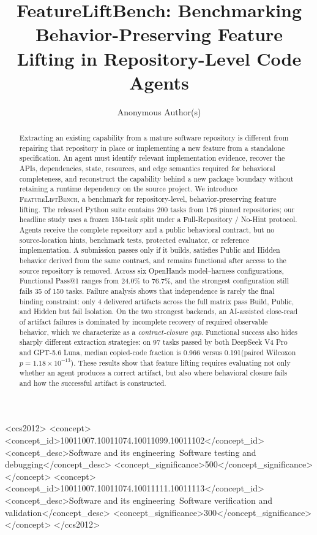 \documentclass[acmsmall,screen,review,anonymous]{acmart}
\newcommand{\flb}{\textsc{FeatureLiftBench}\xspace}
\newcommand{\HeadlineTasks}{150\xspace}
\newcommand{\ReleaseTasks}{200\xspace}
\newcommand{\ReleaseRepos}{176\xspace}
\newcommand{\BestPassRate}{76.7\%\xspace}
\newcommand{\WorstPassRate}{24.0\%\xspace}
\newcommand{\IsolationResidualN}{4\xspace}
\newcommand{\ProLunaCommonN}{97\xspace}
\newcommand{\ProLunaCopyPro}{0.966\xspace}
\newcommand{\ProLunaCopyLuna}{0.191\xspace}
\newcommand{\ProLunaWilcoxon}{1.18\times10^{-13}}
\begin{document}
\title{FeatureLiftBench: Benchmarking Behavior-Preserving Feature Lifting in Repository-Level Code Agents}

\author{Anonymous Author(s)}

\begin{abstract}
Extracting an existing capability from a mature software repository is different
from repairing that repository in place or implementing a new feature from a
standalone specification. An agent must identify relevant implementation evidence,
recover the APIs, dependencies, state, resources, and edge semantics required for
behavioral completeness, and reconstruct the capability behind a new package
boundary without retaining a runtime dependency on the source project. We
introduce \flb, a benchmark for repository-level, behavior-preserving feature
lifting. The released Python suite contains \ReleaseTasks tasks from \ReleaseRepos pinned repositories;
our headline study uses a frozen \HeadlineTasks-task split under a Full-Repository / No-Hint
protocol. Agents receive the complete repository and a public behavioral contract,
but no source-location hints, benchmark tests, protected evaluator, or reference
implementation. A submission passes only if it builds, satisfies Public and Hidden
behavior derived from the same contract, and remains functional after access to
the source repository is removed. Across six OpenHands model--harness
configurations, Functional Pass@1 ranges from \WorstPassRate to \BestPassRate, and the strongest
configuration still fails 35 of 150 tasks. Failure analysis shows that independence
is rarely the final binding constraint: only \IsolationResidualN delivered artifacts across the
full matrix pass Build, Public, and Hidden but fail Isolation. On the two strongest
backends, an AI-assisted close-read of artifact failures is dominated by incomplete
recovery of required observable behavior, which we characterize as a
\emph{contract-closure gap}. Functional success also hides sharply different
extraction strategies: on \ProLunaCommonN tasks passed by both DeepSeek V4 Pro and GPT-5.6 Luna,
median copied-code fraction is \ProLunaCopyPro versus \ProLunaCopyLuna (paired Wilcoxon
$p=\ProLunaWilcoxon$). These results show that feature lifting requires evaluating
not only whether an agent produces a correct artifact, but also where behavioral
closure fails and how the successful artifact is constructed.
\end{abstract}

\begin{CCSXML}
<ccs2012>
 <concept>
  <concept_id>10011007.10011074.10011099.10011102</concept_id>
  <concept_desc>Software and its engineering~Software testing and debugging</concept_desc>
  <concept_significance>500</concept_significance>
 </concept>
 <concept>
  <concept_id>10011007.10011074.10011111.10011113</concept_id>
  <concept_desc>Software and its engineering~Software verification and validation</concept_desc>
  <concept_significance>300</concept_significance>
 </concept>
</ccs2012>
\end{CCSXML}
\end{document}
